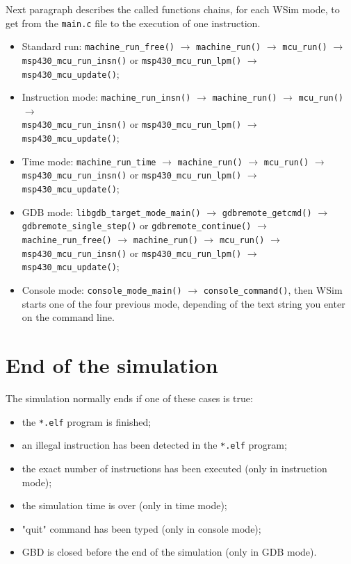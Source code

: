 \documentclass[a4paper,10pt]{report}
\begin{document}
Next paragraph describes the called functions chains, for each WSim
mode, to get from the \verb$main.c$ file to the execution of one
instruction.

\begin{itemize}
  \item Standard run: \verb$machine_run_free()$ $\longrightarrow$ \verb$machine_run()$ $\longrightarrow$ \verb$mcu_run()$ $\longrightarrow$ \verb$msp430_mcu_run_insn()$ or \verb$msp430_mcu_run_lpm()$ $\longrightarrow$ \verb$msp430_mcu_update()$;
  \item Instruction mode: \verb$machine_run_insn()$ $\longrightarrow$ \verb$machine_run()$ $\longrightarrow$ \verb$mcu_run()$ $\longrightarrow$ \\\verb$msp430_mcu_run_insn()$ or \verb$msp430_mcu_run_lpm()$ $\longrightarrow$ \verb$msp430_mcu_update()$;
  \item Time mode: \verb$machine_run_time$ $\longrightarrow$ \verb$machine_run()$ $\longrightarrow$ \verb$mcu_run()$ $\longrightarrow$ \verb$msp430_mcu_run_insn()$ or \verb$msp430_mcu_run_lpm()$ $\longrightarrow$ \verb$msp430_mcu_update()$;
  \item GDB mode: \verb$libgdb_target_mode_main()$ $\longrightarrow$ \verb$gdbremote_getcmd()$ $\longrightarrow$ \verb$gdbremote_single_step()$ or \verb$gdbremote_continue()$ $\longrightarrow$ \verb$machine_run_free()$ $\longrightarrow$ \verb$machine_run()$ $\longrightarrow$ \verb$mcu_run()$ $\longrightarrow$\\ \verb$msp430_mcu_run_insn()$ or \verb$msp430_mcu_run_lpm()$ $\longrightarrow$ \verb$msp430_mcu_update()$;
  \item Console mode: \verb$console_mode_main()$ $\longrightarrow$ \verb$console_command()$, then WSim starts one of the four previous mode, depending of the text string you enter on the command line.
\end{itemize}

\section{End of the simulation}
The simulation normally ends if one of these cases is true:
\begin{itemize}
  \item the \verb$*.elf$ program is finished;
  \item an illegal instruction has been detected in the \verb$*.elf$ program;
  \item the exact number of instructions has been executed (only in instruction mode);
  \item the simulation time is over (only in time mode);
  \item "quit" command has been typed (only in console mode);
  \item GBD is closed before the end of the simulation (only in GDB mode).
\end{itemize}
\end{document}

